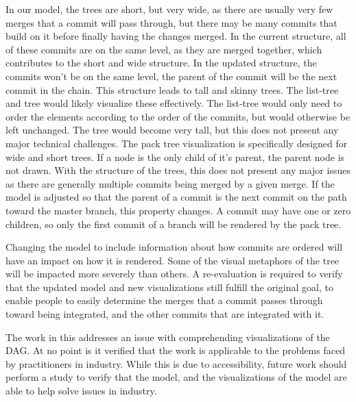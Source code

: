 In our model, the trees are short, but very wide, as there are usually
very few merges that a commit will pass through, but there may be many
commits that build on it before finally having the changes merged.
In the current structure, all of these commits are on the same level, as
they are merged together, which contributes to the short and wide
structure.
In the updated structure, the commits won't be on the same level, the
parent of the commit will be the next commit in the chain.
This structure leads to tall and skinny trees.
The list-tree and \rt{} tree would likely visualize these effectively.
The list-tree would only need to order the elements according to the
order of the commits, but would otherwise be left unchanged.
The \rt{} tree would become very tall, but this does not present any
major technical challenges.
The pack tree visualization is specifically designed for wide and short
trees.
If a node is the only child of it's parent, the parent node is not
drawn.
With the structure of the trees, this does not present any major issues
as there are generally multiple commits being merged by a given merge.
If the model is adjusted so that the parent of a commit is the next
commit on the path toward the master branch, this property changes.
A commit may have one or zero children, so only the first commit of a
branch will be rendered by the pack tree.

Changing the model to include information about how commits are ordered
will have an impact on how it is rendered.
Some of the visual metaphors of the tree will be impacted more severely
than others.
A re-evaluation is required to verify that the updated model and new
visualizations still fulfill the original goal, to enable people to
easily determine the merges that a commit passes through toward being
integrated, and the other commits that are integrated with it.

The work in this \paper{} addresses an issue with comprehending
visualizations of the DAG\@.
At no point is it verified that the work is applicable to the problems
faced by practitioners in industry.
While this is due to accessibility,
future work should perform a study to verify that the \mt{} model,
and the visualizations of the model are able to help solve issues in industry.
